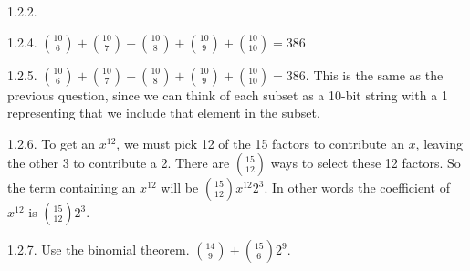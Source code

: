 \begin {itemize}
\begin{ans}{1.2.2.}
  
\end{ans}
\begin{ans}{1.2.4.}
    ${10 \choose 6} + {10\choose 7} + {10\choose 8} + {10 \choose 9} + {10\choose 10} = 386$
  
\end{ans}
\begin{ans}{1.2.5.}
	${10 \choose 6} + {10\choose 7} + {10\choose 8} + {10 \choose 9} + {10\choose 10} = 386$.  This is the same as the previous question, since we can think of each subset as a 10-bit string with a 1 representing that we include that element in the subset.
	
\end{ans}
\begin{ans}{1.2.6.}
		To get an $x^{12}$, we must pick 12 of the 15 factors to contribute an $x$, leaving the other 3 to contribute a 2.  There are ${15 \choose 12}$ ways to select these 12 factors.  So the term containing an $x^{12}$ will be ${15 \choose 12}x^{12}2^{3}$.  In other words the coefficient of $x^{12}$ is ${15\choose 12}2^3$.
	
\end{ans}
\begin{ans}{1.2.7.}
    Use the binomial theorem.  ${14\choose 9} + {15 \choose 6}2^9$.
  

\end{ans}
\end{itemize}
